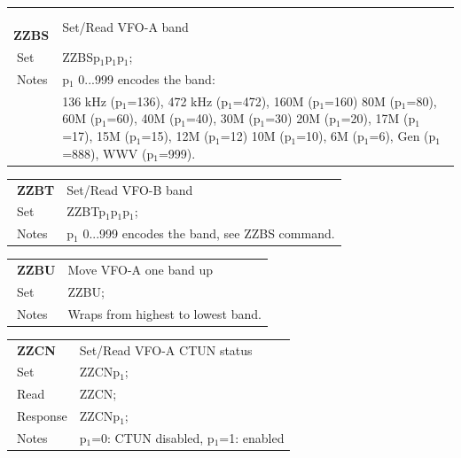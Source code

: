 \documentclass[12pt]{book}
\begin{document}
\begin{center}
\begin{tabular}{|p{2cm}|p{11cm}|}
\toprule
$\phantom{\Big|}$\textbf{\large ZZBS} & Set/Read VFO-A band \\\cline{1-2}
$\phantom{\Big|}${\large Set} & {ZZBSp$_1$p$_1$p$_1$;} \\\hline
$\phantom{\Big|}${\large Notes} & \multicolumn{1}{|p{11cm}|}{p$_1$ 0...999 encodes the band:} \\
 & \multicolumn{1}{|p{11cm}|}{136 kHz (p$_1$=136), 472 kHz (p$_1$=472), 160M (p$_1$=160) 80M (p$_1$=80), 60M (p$_1$=60), 40M (p$_1$=40), 30M (p$_1$=30) 20M (p$_1$=20), 17M (p$_1$=17), 15M (p$_1$=15), 12M (p$_1$=12) 10M (p$_1$=10), 6M (p$_1$=6), Gen (p$_1$=888), WWV (p$_1$=999).} \\
\bottomrule
\end{tabular}
\end{center}

\begin{center}
\begin{tabular}{|p{2cm}|p{11cm}|}
\toprule
$\phantom{\Big|}$\textbf{\large ZZBT} & Set/Read VFO-B band \\\cline{1-2}
$\phantom{\Big|}${\large Set} & {ZZBTp$_1$p$_1$p$_1$;} \\\hline
$\phantom{\Big|}${\large Notes} & \multicolumn{1}{|p{11cm}|}{p$_1$ 0...999 encodes the band, see ZZBS command.} \\
\bottomrule
\end{tabular}
\end{center}

\begin{center}
\begin{tabular}{|p{2cm}|p{11cm}|}
\toprule
$\phantom{\Big|}$\textbf{\large ZZBU} & Move VFO-A one band up \\\cline{1-2}
$\phantom{\Big|}${\large Set} & {ZZBU;} \\\hline
$\phantom{\Big|}${\large Notes} & \multicolumn{1}{|p{11cm}|}{Wraps from highest to lowest band.} \\
\bottomrule
\end{tabular}
\end{center}

\begin{center}
\begin{tabular}{|p{2cm}|p{11cm}|}
\toprule
$\phantom{\Big|}$\textbf{\large ZZCN} & Set/Read VFO-A CTUN status \\\cline{1-2}
$\phantom{\Big|}${\large Set} & {ZZCNp$_1$;} \\\hline
$\phantom{\Big|}${\large Read} & {ZZCN;} \\\hline
$\phantom{\Big|}${\large Response} & {ZZCNp$_1$;} \\\hline
$\phantom{\Big|}${\large Notes} & \multicolumn{1}{|p{11cm}|}{p$_1$=0: CTUN disabled, p$_1$=1: enabled} \\
\bottomrule
\end{tabular}
\end{center}
\end{document}
